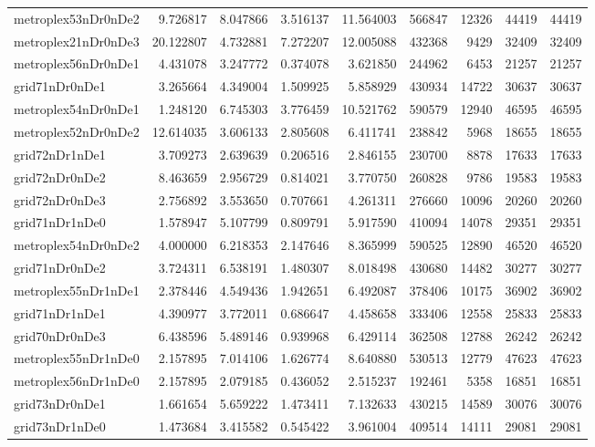 \begin{longtable}{|l|r|r|r|r|r|r|r|r|}
metroplex53nDr0nDe2 & 9.726817 & 8.047866 & 3.516137 & 11.564003 & 566847 & 12326 & 44419 & 44419 \\
metroplex21nDr0nDe3 & 20.122807 & 4.732881 & 7.272207 & 12.005088 & 432368 & 9429 & 32409 & 32409 \\
metroplex56nDr0nDe1 & 4.431078 & 3.247772 & 0.374078 & 3.621850 & 244962 & 6453 & 21257 & 21257 \\
grid71nDr0nDe1 & 3.265664 & 4.349004 & 1.509925 & 5.858929 & 430934 & 14722 & 30637 & 30637 \\
metroplex54nDr0nDe1 & 1.248120 & 6.745303 & 3.776459 & 10.521762 & 590579 & 12940 & 46595 & 46595 \\
metroplex52nDr0nDe2 & 12.614035 & 3.606133 & 2.805608 & 6.411741 & 238842 & 5968 & 18655 & 18655 \\
grid72nDr1nDe1 & 3.709273 & 2.639639 & 0.206516 & 2.846155 & 230700 & 8878 & 17633 & 17633 \\
grid72nDr0nDe2 & 8.463659 & 2.956729 & 0.814021 & 3.770750 & 260828 & 9786 & 19583 & 19583 \\
grid72nDr0nDe3 & 2.756892 & 3.553650 & 0.707661 & 4.261311 & 276660 & 10096 & 20260 & 20260 \\
grid71nDr1nDe0 & 1.578947 & 5.107799 & 0.809791 & 5.917590 & 410094 & 14078 & 29351 & 29351 \\
metroplex54nDr0nDe2 & 4.000000 & 6.218353 & 2.147646 & 8.365999 & 590525 & 12890 & 46520 & 46520 \\
grid71nDr0nDe2 & 3.724311 & 6.538191 & 1.480307 & 8.018498 & 430680 & 14482 & 30277 & 30277 \\
metroplex55nDr1nDe1 & 2.378446 & 4.549436 & 1.942651 & 6.492087 & 378406 & 10175 & 36902 & 36902 \\
grid71nDr1nDe1 & 4.390977 & 3.772011 & 0.686647 & 4.458658 & 333406 & 12558 & 25833 & 25833 \\
grid70nDr0nDe3 & 6.438596 & 5.489146 & 0.939968 & 6.429114 & 362508 & 12788 & 26242 & 26242 \\
metroplex55nDr1nDe0 & 2.157895 & 7.014106 & 1.626774 & 8.640880 & 530513 & 12779 & 47623 & 47623 \\
metroplex56nDr1nDe0 & 2.157895 & 2.079185 & 0.436052 & 2.515237 & 192461 & 5358 & 16851 & 16851 \\
grid73nDr0nDe1 & 1.661654 & 5.659222 & 1.473411 & 7.132633 & 430215 & 14589 & 30076 & 30076 \\
grid73nDr1nDe0 & 1.473684 & 3.415582 & 0.545422 & 3.961004 & 409514 & 14111 & 29081 & 29081 \\

\end{longtable}
